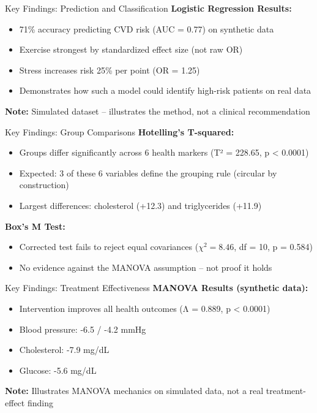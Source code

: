 \documentclass[aspectratio=169,ignorenonframetext]{beamer}
\begin{document}
\begin{frame}{Key Findings: Prediction and Classification}
\textbf{Logistic Regression Results:}

\begin{itemize}
\item
  71\% accuracy predicting CVD risk (AUC = 0.77) on synthetic data
\item
  Exercise strongest by standardized effect size (not raw OR)
\item
  Stress increases risk 25\% per point (OR = 1.25)
\item
  Demonstrates how such a model could identify high-risk patients on
  real data
\end{itemize}

\textbf{Note:} Simulated dataset -- illustrates the method, not a
clinical recommendation
\end{frame}

\begin{frame}{Key Findings: Group Comparisons}
\textbf{Hotelling's T-squared:}

\begin{itemize}
\item
  Groups differ significantly across 6 health markers (T² = 228.65, p
  \textless{} 0.0001)
\item
  Expected: 3 of these 6 variables define the grouping rule (circular by
  construction)
\item
  Largest differences: cholesterol (+12.3) and triglycerides (+11.9)
\end{itemize}

\textbf{Box's M Test:}

\begin{itemize}
\item
  Corrected test fails to reject equal covariances (\(\chi^{2} = 8.46\),
  df = 10, p = 0.584)
\item
  No evidence against the MANOVA assumption -- not proof it holds
\end{itemize}
\end{frame}

\begin{frame}{Key Findings: Treatment Effectiveness}
\textbf{MANOVA Results (synthetic data):}

\begin{itemize}
\item
  Intervention improves all health outcomes (Λ = 0.889, p \textless{}
  0.0001)
\item
  Blood pressure: -6.5 / -4.2 mmHg
\item
  Cholesterol: -7.9 mg/dL
\item
  Glucose: -5.6 mg/dL
\end{itemize}

\textbf{Note:} Illustrates MANOVA mechanics on simulated data, not a
real treatment-effect finding
\end{frame}
\end{document}
